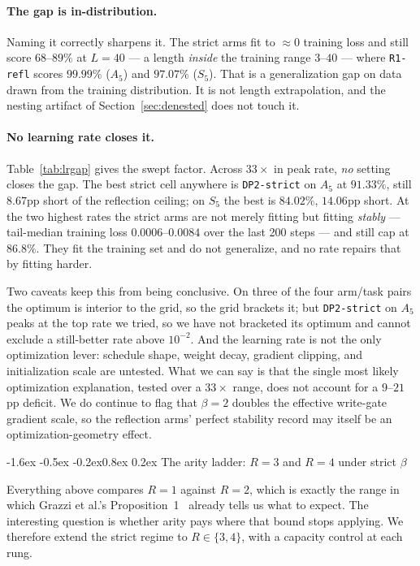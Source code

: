 \documentclass[10pt,twocolumn]{article}
\makeatletter
\renewcommand\subsection{\@startsection{subsection}{2}{\z@}%
  {-1.6ex \@plus -0.5ex \@minus -0.2ex}{0.8ex \@plus 0.2ex}%
  {\normalfont\normalsize\bfseries}}
\makeatother
\begin{document}
\paragraph{The gap is in-distribution.}
Naming it correctly sharpens it. The strict arms fit to $\approx\!0$ training
loss and still score $68$--$89\%$ at $L=40$ --- a length \emph{inside} the
training range $3$--$40$ --- where \texttt{R1-refl} scores $99.99\%$ ($A_5$) and
$97.07\%$ ($S_5$). That is a generalization gap on data drawn from the training
distribution. It is not length extrapolation, and the nesting artifact of
Section~\ref{sec:denested} does not touch it.

\paragraph{No learning rate closes it.}
Table~\ref{tab:lrgap} gives the swept factor. Across $33\times$ in peak rate,
\emph{no} setting closes the gap. The best strict cell anywhere is
\texttt{DP2-strict} on $A_5$ at $91.33\%$, still $8.67$pp short of the reflection
ceiling; on $S_5$ the best is $84.02\%$, $14.06$pp short. At the two highest
rates the strict arms are not merely fitting but fitting \emph{stably} ---
tail-median training loss $0.0006$--$0.0084$ over the last 200 steps --- and
still cap at $86.8\%$. They fit the training set and do not generalize, and no
rate repairs that by fitting harder.

Two caveats keep this from being conclusive. On three of the four arm/task pairs
the optimum is interior to the grid, so the grid brackets it; but
\texttt{DP2-strict} on $A_5$ peaks at the top rate we tried, so we have not
bracketed its optimum and cannot exclude a still-better rate above $10^{-2}$.
And the learning rate is not the only optimization lever: schedule shape, weight
decay, gradient clipping, and initialization scale are untested. What we can say
is that the single most likely optimization explanation, tested over a $33\times$
range, does not account for a $9$--$21$pp deficit. We do continue to flag that
$\beta=2$ doubles the effective write-gate gradient scale, so the reflection
arms' perfect stability record may itself be an optimization-geometry effect.

\subsection{The arity ladder: $R=3$ and $R=4$ under strict $\beta$}
\label{sec:ladder}

Everything above compares $R{=}1$ against $R{=}2$, which is exactly the range in
which Grazzi et al.'s Proposition~1~\cite{grazzi2025} already tells us what to expect.
The interesting question is whether arity pays where that bound stops applying.
We therefore extend the strict regime to $R\in\{3,4\}$, with a capacity control
at each rung.
\end{document}
